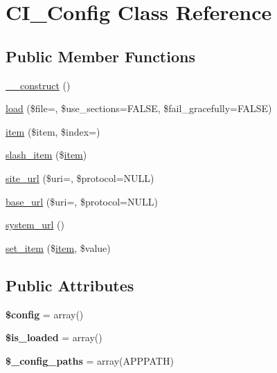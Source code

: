 \hypertarget{class_c_i___config}{}\section{C\+I\+\_\+\+Config Class Reference}
\label{class_c_i___config}
\subsection*{Public Member Functions}
\begin{DoxyCompactItemize}
\item 
\mbox{\hyperlink{class_c_i___config_abf45f6b82f733395efce1fce008d7a6b}{\+\_\+\+\_\+construct}} ()
\item 
\mbox{\hyperlink{class_c_i___config_af0cad6d5fc3690431745fe231267a0df}{load}} (\$file=\textquotesingle{}\textquotesingle{}, \$use\+\_\+sections=F\+A\+L\+SE, \$fail\+\_\+gracefully=F\+A\+L\+SE)
\item 
\mbox{\hyperlink{class_c_i___config_af4951bae8f3fa087433e32e5b8dff720}{item}} (\$item, \$index=\textquotesingle{}\textquotesingle{})
\item 
\mbox{\hyperlink{class_c_i___config_a1cf9de5ac1d68c1142faeeb427b1716b}{slash\+\_\+item}} (\$\mbox{\hyperlink{class_c_i___config_af4951bae8f3fa087433e32e5b8dff720}{item}})
\item 
\mbox{\hyperlink{class_c_i___config_a34910bd5416c575494ba959ff31c99b4}{site\+\_\+url}} (\$uri=\textquotesingle{}\textquotesingle{}, \$protocol=N\+U\+LL)
\item 
\mbox{\hyperlink{class_c_i___config_a0dfc477485c805f112f93045a1de84c2}{base\+\_\+url}} (\$uri=\textquotesingle{}\textquotesingle{}, \$protocol=N\+U\+LL)
\item 
\mbox{\hyperlink{class_c_i___config_ad3ca14c7961f9a42d494e3317d90edef}{system\+\_\+url}} ()
\item 
\mbox{\hyperlink{class_c_i___config_a460b019f9e1562f3b7796f4da8c444f3}{set\+\_\+item}} (\$\mbox{\hyperlink{class_c_i___config_af4951bae8f3fa087433e32e5b8dff720}{item}}, \$value)
\end{DoxyCompactItemize}
\subsection*{Public Attributes}
\begin{DoxyCompactItemize}
\item 
\mbox{\label{class_c_i___config_a21db3daf5804ef6e16825222b4383aa4}} 
{\bfseries \$config} = array()
\item 
\mbox{\label{class_c_i___config_a0b633c8201ae0f05da6392aa24c80ad8}} 
{\bfseries \$is\+\_\+loaded} = array()
\item 
\mbox{\label{class_c_i___config_a338c0229927927cc27771464cc8f2cbb}} 
{\bfseries \$\+\_\+config\+\_\+paths} = array(A\+P\+P\+P\+A\+TH)
\end{DoxyCompactItemize}

